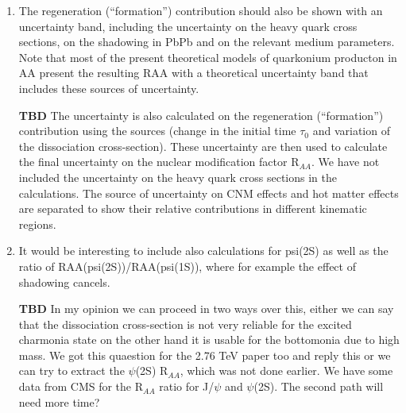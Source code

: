 \documentclass[a4paper,11pt]{article}
\begin{document}
\begin{enumerate}
\item  The regeneration (“formation”) contribution should also be shown with an uncertainty band, including the uncertainty on the heavy quark
  cross sections, on the shadowing in PbPb and on the relevant medium parameters. Note that most of the present theoretical models of quarkonium
  producton in AA present the resulting RAA with a theoretical uncertainty band that includes these sources of uncertainty.


  {\color{red} \textbf{TBD}
    The uncertainty is also calculated on the regeneration (“formation”) contribution using the sources (change in the initial time $\tau_0$ and
    variation of the dissociation cross-section). These uncertainty are then used to calculate the final uncertainty on the nuclear modification
    factor R$_{AA}$. We have not included the uncertainty on the heavy quark cross sections in the calculations. The source of uncertainty on
    CNM effects and hot matter effects are separated to show their relative contributions in different kinematic regions.  
}



\item It would be interesting to include also calculations for psi(2S) as well as the ratio of RAA(psi(2S))/RAA(psi(1S)), where for
  example the effect of shadowing cancels. 


  {\color{red} \textbf{TBD}
    In my opinion we can proceed in two ways over this, either we can say that the dissociation cross-section is not very reliable for the
    excited charmonia state on the other hand it is usable for the bottomonia due to high mass. We got this quaestion for the 2.76 TeV paper
    too and reply this or we can try to extract the $\psi$(2S) R$_{AA}$, which was not done earlier. We have some data from CMS for the
    R$_{AA}$ ratio for J/$\psi$ and $\psi$(2S). The second path will need more time?
    }

\end{enumerate}
\end{document}

